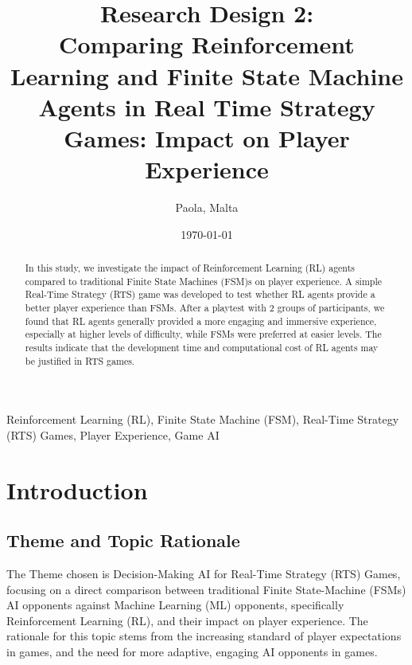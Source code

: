 \documentclass[conference]{IEEEtran}
\begin{document}
\title{Research Design 2:\\ Comparing Reinforcement Learning and Finite State Machine Agents in Real Time Strategy Games: Impact on Player Experience}

\author{
	Paola, Malta
}

\date{\today}

\maketitle

\begin{abstract}
	In this study, we investigate the impact of Reinforcement Learning (RL) agents compared to traditional Finite State Machines (FSM)s on player experience.
	A simple Real-Time Strategy (RTS) game was developed to test whether RL agents provide a better player experience than FSMs. After a playtest with 2 
	groups of participants, we found that RL agents generally provided a more engaging and immersive experience, especially at higher levels of difficulty,
	while FSMs were preferred at easier levels. The results indicate that the development time and computational cost of RL agents may be justified in RTS games.
\end{abstract}

\begin{IEEEkeywords}
	Reinforcement Learning (RL), Finite State Machine (FSM), Real-Time Strategy (RTS) Games, Player Experience, Game AI
\end{IEEEkeywords}

\section{Introduction}

\subsection{Theme and Topic Rationale}

The Theme chosen is Decision-Making AI for Real-Time Strategy (RTS) Games, focusing on a direct comparison between traditional Finite State-Machine (FSMs) AI opponents against Machine Learning (ML) opponents,
specifically Reinforcement Learning (RL), and their impact on player experience. The rationale for this topic stems from the increasing standard of player expectations in games, and the need for more adaptive,
engaging AI opponents in games.
\end{document}
